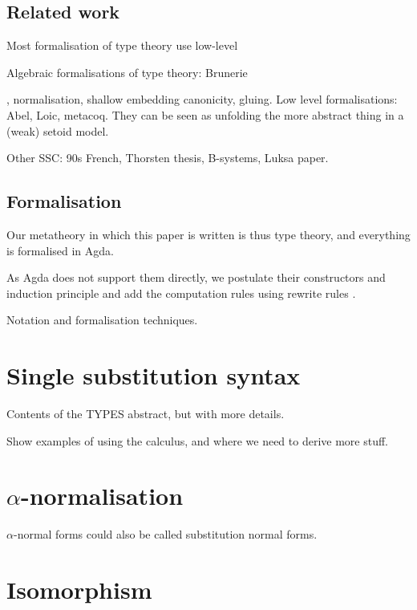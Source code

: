 \documentclass[sigplan,10pt,anonymous,review]{acmart}\settopmatter{printfolios=true,printccs=false,printacmref=false}
\begin{document}
\subsection{Related work}

Most formalisation of type theory use low-level 

Algebraic formalisations of type theory: Brunerie

\cite{initiality-agda} \cite{DBLP:conf/popl/AltenkirchK16},
normalisation, shallow embedding canonicity, gluing. Low level
formalisations: Abel, Loic, metacoq. They can be seen as unfolding the
more abstract thing in a (weak) setoid model.

Other SSC: 90s French, Thorsten thesis, B-systems, Luksa paper.


\subsection{Formalisation}

Our metatheory in which this paper is
written is thus type theory, and everything is formalised in Agda.

As Agda does not support them directly, we postulate their
constructors and induction principle and add the computation rules
using rewrite rules \cite{DBLP:conf/types/Cockx19}.

Notation and formalisation techniques.

\section{Single substitution syntax}
\label{sec:ssc}

Contents of the TYPES abstract, but with more details.

Show examples of using the calculus, and where we need to derive more
stuff.

\section{$\alpha$-normalisation}
\label{sec:alpha}

$\alpha$-normal forms could also be called substitution normal forms.

\section{Isomorphism}
\label{sec:cwf}
\end{document}
